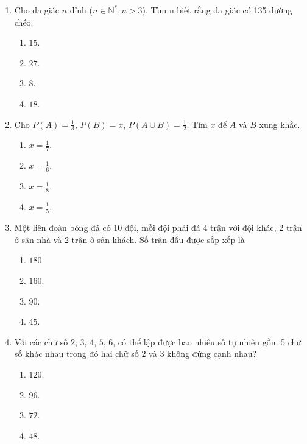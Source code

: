 \begin{enumerate}[label=\textbf{Câu \arabic*.},align=left,left=0cm..0cm,itemindent=*]
\begin{multicols}{4}
\begin{enumerate}[label=\textbf{\Alph*.},align=left,left=1cm..0cm,itemindent=*]
	\end{enumerate}\end{multicols}
	\item Cho đa giác $n$ đỉnh ($n\in \mathbb{N}^{*},n>3$). Tìm n biết rằng đa giác có 135 đường chéo.
	\begin{multicols}{4}\begin{enumerate}[label=\textbf{\Alph*.},align=left,left=1cm..0cm,itemindent=*]
		\item $15$. \item $27$. \item $8$. \item $18$.
	\end{enumerate}\end{multicols}
	\item Cho $P(A)=\frac 13$, $P(B)=x$, $P(A\cup B)=\frac 12$. Tìm $x$ để $A$ và $B$ xung khắc.
	\begin{multicols}{4}\begin{enumerate}[label=\textbf{\Alph*.},align=left,left=1cm..0cm,itemindent=*]
		\item $x=\frac 17$. \item $x=\frac 16$. \item $x=\frac 18$. \item $x=\frac 15$.
	\end{enumerate}\end{multicols}
	\item Một liên đoàn bóng đá có 10 đội, mỗi đội phải đá 4 trận với đội khác, 2 trận ở sân nhà và 2 trận ở sân khách. Số trận đấu được sắp xếp là
	\begin{multicols}{4}\begin{enumerate}[label=\textbf{\Alph*.},align=left,left=1cm..0cm,itemindent=*]
		\item $180$. \item $160$. \item $90$. \item $45$.
	\end{enumerate}\end{multicols}
	\item Với các chữ số $2$, $3$, $4$, $5$, $6$, có thể lập được bao nhiêu số tự nhiên gồm 5 chữ số khác nhau trong đó hai chữ số $2$ và $3$ không đứng cạnh nhau?
	\begin{multicols}{4}\begin{enumerate}[label=\textbf{\Alph*.},align=left,left=1cm..0cm,itemindent=*]
		\item $120$. \item $96$. \item $72$. \item $48$.

\end{enumerate}
\end{multicols}
\end{enumerate}
